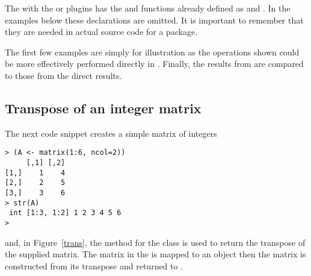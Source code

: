 \documentclass[shortnames,article]{jss}
\begin{document}
The  with the  or 
plugins has the  and  functions already defined as
 and .  In the examples below
these declarations are omitted.  It is important to remember that they are
needed in actual  source code for a package.

The first few examples are simply for illustration as the operations
shown could be more effectively performed directly in .
Finally, the results from  are compared to those from the direct
 results.

\subsection{Transpose of an integer matrix}
\label{sec:transpose}

The next  code snippet creates a simple matrix of integers
\begin{verbatim}
> (A <- matrix(1:6, ncol=2))
     [,1] [,2]
[1,]    1    4
[2,]    2    5
[3,]    3    6
> str(A)
 int [1:3, 1:2] 1 2 3 4 5 6
> 
\end{verbatim}
and, in Figure~\ref{trans}, the  method for the
 class is used to return the transpose of the supplied matrix. The 
matrix in the   is mapped to an
 object then the matrix  is constructed
from its transpose and returned to .
\end{document}
